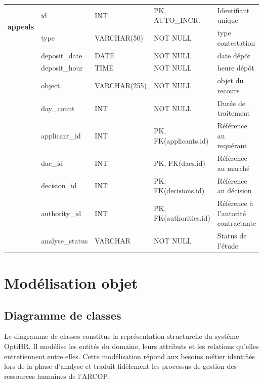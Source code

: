 \begin{longtable}{|p{2.5cm}|p{3cm}|p{3cm}|p{3cm}|p{3cm}|}
    \multirow{2}{*}{\textbf{appeals}} & id & INT & PK, AUTO\_INCR. & Identifiant unique \\
    \cline{2-5}
    & type & VARCHAR(50) & NOT NULL & type contestation \\
    \cline{2-5}
    & deposit\_date & DATE & NOT NULL & date dépôt \\
    \cline{2-5}
    & deposit\_hour & TIME & NOT NULL & heure dépôt \\
    \cline{2-5}
    & object & VARCHAR(255) & NOT NULL & objet du recours \\
    \cline{2-5}
    & day\_count & INT & NOT NULL & Durée de traitement \\
    \cline{2-5}
     & applicant\_id & INT & PK, FK(applicants.id) & Référence au requérant \\
     \cline{2-5}
     & dac\_id & INT & PK, FK(dacs.id) & Référence au marché \\
     \cline{2-5}
     & decision\_id & INT & PK, FK(decisions.id) & Référence au décision \\
     \cline{2-5}
     & authority\_id & INT & PK, FK(authorities.id) & Référence à l'autorité contractante \\
     \cline{2-5}
    & analyse\_status & VARCHAR & NOT NULL & Status de l'étude \\
    \hline


\end{longtable}
\begin{center}  
    \label{tab:table_dictionnaire_data_ameliore}  
\end{center}




\section{Modélisation objet}

\subsection{Diagramme de classes}
Le diagramme de classes constitue la représentation structurelle du système OptiHR. Il modélise les entités du domaine, leurs attributs et les relations qu'elles entretiennent entre elles. Cette modélisation répond aux besoins métier identifiés lors de la phase d'analyse et traduit fidèlement les processus de gestion des ressources humaines de l'ARCOP.

